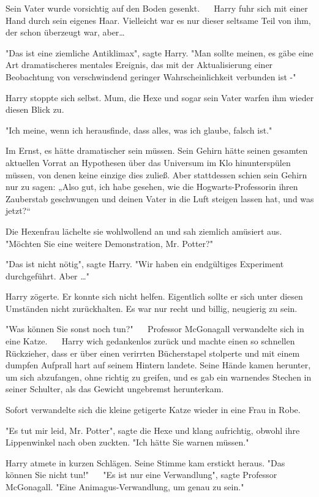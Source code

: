 {Sein Vater wurde vorsichtig auf den Boden gesenkt. ~ ~Harry fuhr sich mit einer Hand durch sein eigenes Haar. Vielleicht war es nur dieser seltsame Teil von ihm, der schon überzeugt war, aber…

"Das ist eine ziemliche Antiklimax", sagte Harry. "Man sollte meinen, es gäbe eine Art dramatischeres mentales Ereignis, das mit der Aktualisierung einer Beobachtung von verschwindend geringer Wahrscheinlichkeit verbunden ist -"

Harry stoppte sich selbst. Mum, die Hexe und sogar sein Vater warfen ihm wieder diesen Blick zu.

"Ich meine, wenn ich herausfinde, dass alles, was ich glaube, falsch ist." ~ ~

Im Ernst, es hätte dramatischer sein müssen. Sein Gehirn hätte seinen gesamten aktuellen Vorrat an Hypothesen über das Universum im Klo hinunterspülen müssen, von denen keine einzige dies zuließ. Aber stattdessen schien sein Gehirn nur zu sagen: „Also gut, ich habe gesehen, wie die Hogwarts-Professorin ihren Zauberstab geschwungen und deinen Vater in die Luft steigen lassen hat, und was jetzt?“ ~ ~

Die Hexenfrau lächelte sie wohlwollend an und sah ziemlich amüsiert aus. "Möchten Sie eine weitere Demonstration, Mr. Potter?" ~ ~

"Das ist nicht nötig", sagte Harry. "Wir haben ein endgültiges Experiment durchgeführt. Aber …"

Harry zögerte. Er konnte sich nicht helfen. Eigentlich sollte er sich unter diesen Umständen nicht zurückhalten. Es war nur recht und billig, neugierig zu sein.

"Was können Sie sonst noch tun?" ~ ~Professor McGonagall verwandelte sich in eine Katze. ~ ~Harry wich gedankenlos zurück und machte einen so schnellen Rückzieher, dass er über einen verirrten Bücherstapel stolperte und mit einem dumpfen Aufprall hart auf seinem Hintern landete. Seine Hände kamen herunter, um sich abzufangen, ohne richtig zu greifen, und es gab ein warnendes Stechen in seiner Schulter, als das Gewicht ungebremst herunterkam. ~ ~

Sofort verwandelte sich die kleine getigerte Katze wieder in eine Frau in Robe.

"Es tut mir leid, Mr. Potter", sagte die Hexe und klang aufrichtig, obwohl ihre Lippenwinkel nach oben zuckten. "Ich hätte Sie warnen müssen." ~ ~

Harry atmete in kurzen Schlägen. Seine Stimme kam erstickt heraus. "Das können Sie nicht tun!" ~ ~"Es ist nur eine Verwandlung", sagte Professor McGonagall. "Eine Animagus-Verwandlung, um genau zu sein." ~ ~

}
